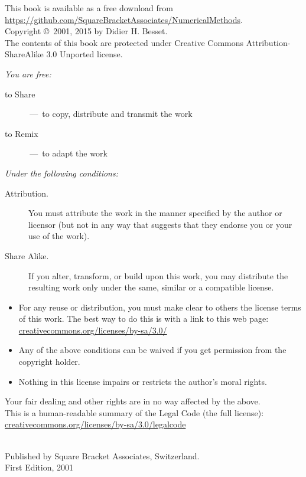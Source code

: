 \documentclass[twoside]{book}
\begin{document}
\begin{footnotesize}
\setlength{\parindent}{0pt}
This book is available as a free download from \url{https://github.com/SquareBracketAssociates/NumericalMethods}.\\[1cm]

Copyright \copyright~2001, 2015 by Didier H. Besset.\\[1cm]

The contents of this book are protected under Creative Commons Attribution-ShareAlike 3.0 Unported license.

\emph{You are free:}
\begin{description}
  \item[to Share] \,---\, to copy, distribute and transmit the work
  \item[to Remix] \,---\, to adapt the work
\end{description}
\emph{Under the following conditions:}
\begin{description}
  \item[Attribution.] You must attribute the work in the manner specified by the author or licensor (but not in any way that suggests that they endorse you or your use of the work).
  \item[Share Alike.] If you alter, transform, or build upon this work, you may distribute the resulting work only under the same, similar or a compatible license.
\end{description}
\begin{itemize}
  \item For any reuse or distribution, you must make clear to others the license terms of this work. The best way to do this is with a link to this web page:
  \url{creativecommons.org/licenses/by-sa/3.0/}
  \item Any of the above conditions can be waived if you get permission from the copyright holder.
  \item Nothing in this license impairs or restricts the author's moral rights.
\end{itemize}
\quad
\parbox{\textwidth}{
	Your fair dealing and other rights are in no way affected by the above.\\
	This is a human-readable summary of the Legal Code (the full license):\\
	\url{creativecommons.org/licenses/by-sa/3.0/legalcode}}\\[1cm]
Published by Square Bracket Associates, Switzerland.\\
First Edition, 2001
\end{footnotesize}
\vfill
\end{document}
